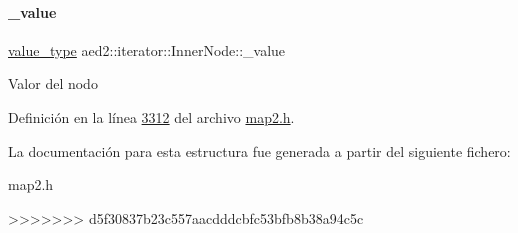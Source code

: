 \paragraph{\texorpdfstring{\+\_\+value}{\_value}}
{\footnotesize\ttfamily \hyperlink{classaed2_1_1iterator_a6411a2c08b2b7c52f063bef1a168acb6_a6411a2c08b2b7c52f063bef1a168acb6}{value\+\_\+type} aed2\+::iterator\+::\+Inner\+Node\+::\+\_\+value}

Valor del nodo 

Definición en la línea \hyperlink{map2_8h_source_l03312}{3312} del archivo \hyperlink{map2_8h_source}{map2.\+h}.



La documentación para esta estructura fue generada a partir del siguiente fichero\+:\begin{DoxyCompactItemize}
\item 
map2.\+h\end{DoxyCompactItemize}
>>>>>>> d5f30837b23c557aacdddcbfc53bfb8b38a94c5c

